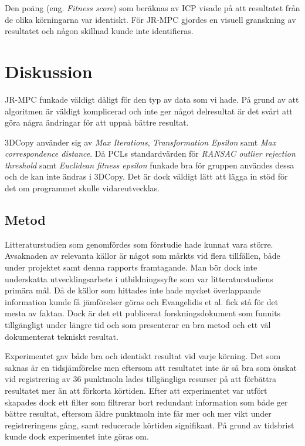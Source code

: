 Den poäng (eng. \textit{Fitness score}) som beräknas av ICP visade på att resultatet från de olika körningarna var identiskt. För JR-MPC gjordes en visuell granskning av resultatet och någon skillnad kunde inte identifieras.


\section{Diskussion}
\label{sec:discussion-karlsson}

JR-MPC funkade väldigt dåligt för den typ av data som vi hade. På grund av att algoritmen är väldigt komplicerad och inte ger något delresultat är det svårt att göra några ändringar för att uppnå bättre resultat.

3DCopy använder sig av \textit{Max Iterations}, \textit{Transformation Epsilon} samt \textit{Max correspondence distance}. Då PCLs standardvärden för \textit{RANSAC outlier rejection threshold} samt \textit{Euclidean fitness epsilon} funkade bra för gruppen användes dessa och de kan inte ändras i 3DCopy. Det är dock väldigt lätt att lägga in stöd för det om programmet skulle vidareutvecklas.

\subsection{Metod}

Litteraturstudien som genomfördes som förstudie hade kunnat vara större. Avsaknaden av relevanta källor är något som märkts vid flera tillfällen, både under projektet samt denna rapports framtagande. Man bör dock inte underskatta utvecklingsarbete i utbildningssyfte som var litteraturstudiens primära mål. Då de källor som hittades inte hade mycket överlappande information kunde få jämförelser göras och Evangelidis et al. \cite{Evangelidis-ECCV-2014} fick stå för det mesta av faktan. Dock är det ett publicerat forskningsdokument som funnits tillgängligt under längre tid och som presenterar en bra metod och ett väl dokumenterat tekniskt resultat.

Experimentet gav både bra och identiskt resultat vid varje körning. Det som saknas är en tidsjämförelse men eftersom att resultatet inte är så bra som önskat vid registrering av 36 punktmoln lades tillgängliga resurser på att förbättra resultatet mer än att förkorta körtiden. Efter att experimentet var utfört skapades dock ett filter som filtrerar bort redundant information som både ger bättre resultat, eftersom äldre punktmoln inte får mer och mer vikt under registreringens gång, samt reducerade körtiden signifikant. På grund av tidsbrist kunde dock experimentet inte göras om. 

